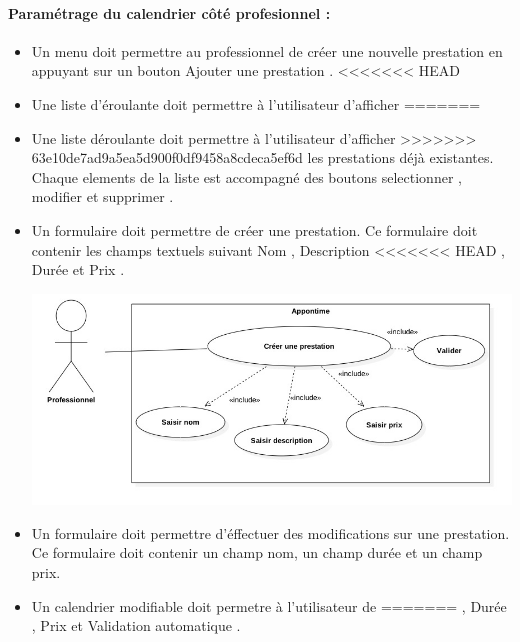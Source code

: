 \documentclass{article}
\begin{document}
\begin{itemize}
\begin{itemize}
\end{itemize}


\paragraph{Paramétrage du calendrier côté profesionnel :}
\begin{itemize}
\item Un menu doit permettre au professionnel de créer une nouvelle
  prestation en appuyant sur un bouton \og Ajouter une prestation
  \fg{}.
<<<<<<< HEAD
\item Une liste d'éroulante doit permettre à l'utilisateur d'afficher
=======
\item Une liste déroulante doit permettre à l'utilisateur d'afficher
>>>>>>> 63e10de7ad9a5ea5d900f0df9458a8cdeca5ef6d
  les prestations déjà existantes. Chaque elements de la liste est
  accompagné des boutons \og selectionner \fg{}, \og modifier \fg{} et
  \og supprimer \fg{}.

\item Un formulaire doit permettre de créer une prestation. Ce
  formulaire doit contenir les champs textuels suivant \og Nom \fg{}, \og Description
<<<<<<< HEAD
 \fg{},  \og Durée \fg{} et \og Prix \fg{}.

\includegraphics[scale=0.5]{ShematDiagrammes/useCaseCreerPrestation.jpg}

\item Un formulaire doit permettre d'éffectuer des modifications sur
  une prestation. Ce formulaire doit contenir un champ nom, un champ
  durée et un champ prix.
\item Un calendrier modifiable doit permetre à l'utilisateur de
=======
 \fg{},  \og Durée \fg{}, \og Prix \fg{} et \og Validation automatique \fg{}.



\end{itemize}
\end{itemize}
\end{document}
